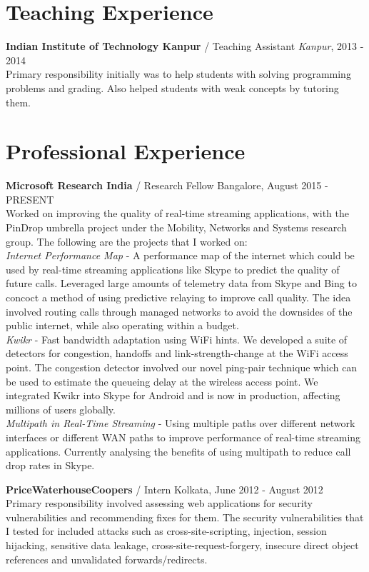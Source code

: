 \documentclass[margin,line]{res}
\begin{document}
\begin{resume}
\section{\sc Teaching Experience}
{\bf Indian Institute of Technology Kanpur} / Teaching Assistant {\hfill}{\em Kanpur}, 2013 - 2014 \\
Primary responsibility initially was to help students with solving programming problems and grading. Also helped students with weak concepts by tutoring them.

\section{\sc Professional Experience}
{\bf Microsoft Research India} / Research Fellow {\hfill}Bangalore, August 2015 - PRESENT \\
Worked on improving the quality of real-time streaming applications, with the PinDrop umbrella project under the Mobility, Networks and Systems research group. The following are the projects that I worked on: \\
{\em Internet Performance Map} - A performance map of the internet which could be used by real-time streaming applications like Skype to predict the quality of future calls. Leveraged large amounts of telemetry data from Skype and Bing to concoct a method of using predictive relaying to improve call quality. The idea involved routing calls through managed networks to avoid the downsides of the public internet, while also operating within a budget. \\
{\em Kwikr} - Fast bandwidth adaptation using WiFi hints. We developed a suite of detectors for congestion, handoffs and link-strength-change at the WiFi access point. The congestion detector involved our novel ping-pair technique which can be used to estimate the queueing delay at the wireless access point. We integrated Kwikr into Skype for Android and is now in production, affecting millions of users globally. \\
{\em Multipath in Real-Time Streaming} - Using multiple paths over different network interfaces or different WAN paths to improve performance of real-time streaming applications. Currently analysing the benefits of using multipath to reduce call drop rates in Skype.

{\bf PriceWaterhouseCoopers} / Intern {\hfill} Kolkata, June 2012 - August 2012 \\
Primary responsibility involved assessing web applications for security vulnerabilities and recommending fixes for them. The security vulnerabilities that I tested for included attacks such as cross-site-scripting, injection, session hijacking, sensitive data leakage, cross-site-request-forgery, insecure direct object references and unvalidated forwards/redirects. 


\end{resume}
\end{document}
